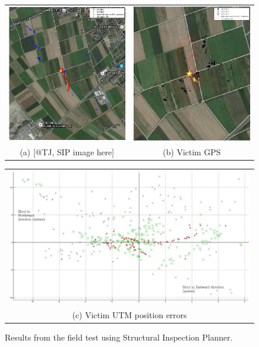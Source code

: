 \documentclass[runningheads]{llncs}
\begin{document}
\begin{figure}
  \centering
  \begin{tabular}{cc}
    \includegraphics[width=6cm]{img/victim_gps/victim_gps_on_map.jpg} &
    \includegraphics[width=6cm]{img/victim_gps/victim_gps_on_map_3.jpg} \\
    \small (a) [@TJ, SIP image here] & 
    \small (b) Victim GPS
  \end{tabular}

  \vspace{\floatsep}
  
  \begin{tabular}{c}
    \includegraphics[width=11cm]{img/victim_gps/victim_utm_errors.jpg} \\
    \small (c) Victim UTM position errors
  \end{tabular}

  \caption{Results from the field test using Structural Inspection Planner.}\label{fig:victim_gps}
\end{figure}
\end{document}
